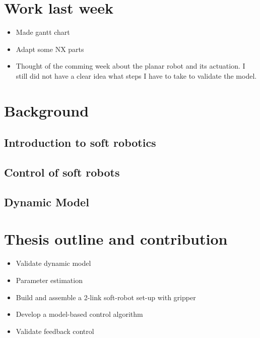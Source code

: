 \section{Work last week}

\begin{itemize}
    \item Made gantt chart
    \item Adapt some NX parts
    \item Thought of the comming week about the planar robot and its actuation. I still did not have a clear idea what steps I have to take to validate the model.
\end{itemize}


\section{Background}


\subsection{Introduction to soft robotics}


\subsection{Control of soft robots}




\subsection{Dynamic Model}



\section{Thesis outline and contribution}




\begin{itemize}
    \item Validate dynamic model
    \item Parameter estimation
    \item Build and assemble a 2-link soft-robot set-up with gripper
    \item Develop a model-based control algorithm
    \item Validate feedback control
\end{itemize}